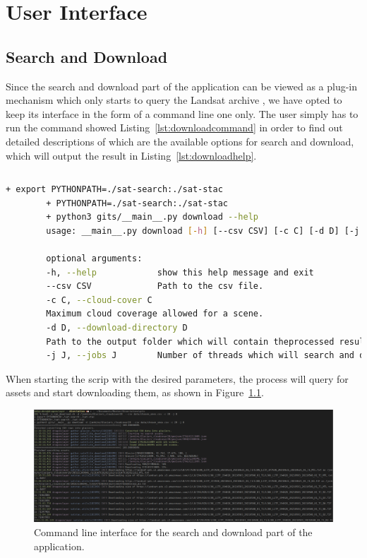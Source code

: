 \documentclass[12pt, a4paper]{report}
\begin{document}
	\vfill

	\chapter{User Interface}
	\label{seq:gui}
	
	\section{Search and Download}
	\label{sec:search_download}
	
	\par Since the search and download part of the application can be viewed as a plug-in mechanism which only starts to query the Landsat archive , we have opted to keep its interface in the form of a command line one only. The user simply has to run the command showed Listing~\ref{lst:downloadcommand} in order to find out detailed descriptions of which are the available options for search and download, which will output the result in Listing~\ref{lst:downloadhelp}.
	
	\begin{lstlisting}[caption={Help command for sarch and download.},label={lst:downloadcommand},language=Bash]
		% bash -x run_download.sh --help
	\end{lstlisting}
	
	\begin{lstlisting}[caption={Detailed parameters required for the download script.},label={lst:downloadhelp},language=Bash]
		+ export PYTHONPATH=./sat-search:./sat-stac
		+ PYTHONPATH=./sat-search:./sat-stac
		+ python3 gits/__main__.py download --help
		usage: __main__.py download [-h] [--csv CSV] [-c C] [-d D] [-j J]
		
		optional arguments:
		-h, --help            show this help message and exit
		--csv CSV             Path to the csv file.
		-c C, --cloud-cover C
		Maximum cloud coverage allowed for a scene.
		-d D, --download-directory D
		Path to the output folder which will contain theprocessed results.
		-j J, --jobs J        Number of threads which will search and download.
	\end{lstlisting}

	When starting the scrip with the desired parameters, the process will query for assets and start downloading them, as shown in Figure~\ref{fig:download_cmd}.
	
	\begin{figure}[h!]
		\centering
		\includegraphics[width=\columnwidth]{../images/download_cmd.png}
		\caption{Command line interface for the search and download part of the application.}
		\label{fig:download_cmd}
	\end{figure}
\end{document}
